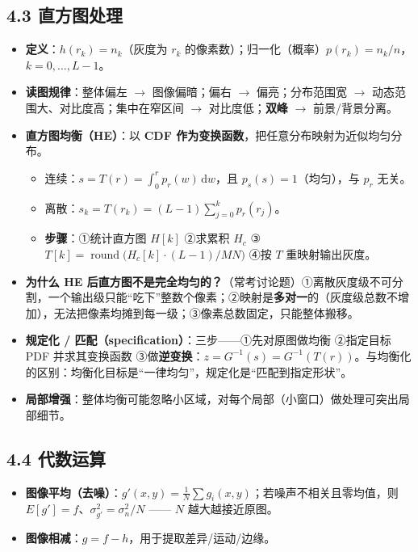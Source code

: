 \subsection*{4.3 直方图处理}
\begin{itemize}
\item \textbf{定义}：$h(r_k)=n_k$（灰度为 $r_k$ 的像素数）；归一化（概率）$p(r_k)=n_k/n$，$k=0,\ldots,L-1$。
\item \textbf{读图规律}：整体偏左 $\to$ 图像偏暗；偏右 $\to$ 偏亮；分布范围宽 $\to$ 动态范围大、对比度高；集中在窄区间 $\to$ 对比度低；\textbf{双峰} $\to$ 前景/背景分离。
\item \textbf{直方图均衡（HE）}：以 \textbf{CDF 作为变换函数}，把任意分布映射为近似均匀分布。
\begin{itemize}
\item 连续：$s=T(r)=\int_0^r p_r(w)\,\mathrm{d}w$，且 $p_s(s)=1$（均匀），与 $p_r$ 无关。
\item 离散：$s_k=T(r_k)=(L-1)\sum_{j=0}^k p_r(r_j)$。
\item \textbf{步骤}：①统计直方图 $H[k]$ ②求累积 $H_c$ ③$T[k]=\operatorname{round}\bigl(H_c[k]\cdot(L-1)/MN\bigr)$ ④按 $T$ 重映射输出灰度。
\end{itemize}
\item \textbf{为什么 HE 后直方图不是完全均匀的？}（常考讨论题）①离散灰度级不可分割，一个输出级只能“吃下”整数个像素；②映射是\textbf{多对一}的（灰度级总数不增加），无法把像素均摊到每一级；③像素总数固定，只能整体搬移。
\item \textbf{规定化 / 匹配（specification）}：三步——①先对原图做均衡 ②指定目标 PDF 并求其变换函数 ③做\textbf{逆变换}：$z=G^{-1}(s)=G^{-1}(T(r))$。与均衡化的区别：均衡化目标是“一律均匀”，规定化是“匹配到指定形状”。
\item \textbf{局部增强}：整体均衡可能忽略小区域，对每个局部（小窗口）做处理可突出局部细节。
\end{itemize}
\subsection*{4.4 代数运算}
\begin{itemize}
\item \textbf{图像平均（去噪）}：$g'(x,y)=\frac{1}{N}\sum g_i(x,y)$；若噪声不相关且零均值，则 $E[g']=f$、$\sigma_{g'}^2=\sigma_n^2/N$ —— $N$ 越大越接近原图。
\item \textbf{图像相减}：$g=f-h$，用于提取差异/运动/边缘。
\end{itemize}
